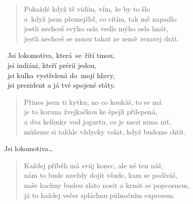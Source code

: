 \begin{song}{}
\begin{verse}
   Pokaždé když tě vidím, vím, že by to šlo  \\
   a~když jsem přemejšlel, co cítím, tak mě napadlo  \\
   jestli nechceš svýho osla vedle mýho osla hnát,  \\
   jestli nechceš se mnou tahat ze země~rezavej drát. 
\end{verse}
\begin{refren}
   ~Jsi lokomotiva, která~se~řítí tmou,  \\
   ~jsi indiáni, kteří prérií jedou, \\
   ~jsi kulka vystřelená do~mojí hlavy,      \\
   ~jsi prezident a já tvé spojené státy. 
\end{refren}
\begin{verse}
  Přines jsem ti kytku, no co koukáš, to se má  \\
   je to koruna žvejkačkou ke špejli přilepená,  \\
   a dva kelímky vod jogurtu, co je mezi nima niť,  \\
   můžeme si takhle vždycky volat, když budeme chtít. 
\end{verse}
\begin{refren}
   Jsi lokomotiva\ldots
\end{refren}


\begin{verse}
   Každej příběh má svůj konec, ale né ten náš,  \\
   nám to bude navždy dojit všude, kam se podíváš,  \\
   naše kachny budou zlato nosit a krmit se popcornem,  \\
   já to každej večer spláchnu půlnočním expresem. 
\end{verse}

\chordbreak
\compactbreak
\nochordbreak


\end{song}

